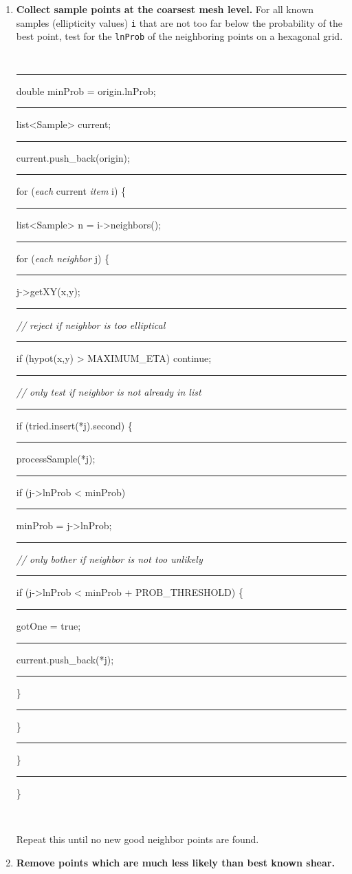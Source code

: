 \documentclass[useAMS,usenatbib,usegraphicx]{mn2e}
\begin{document}
\begin{enumerate}
\item {\bf Collect sample points at the coarsest mesh level.} 
For all known samples (ellipticity values) \texttt{i} that are not too far below 
the probability of the best point, test for the {\tt lnProb} of the neighboring points 
on a hexagonal grid. \\
\begin{boxit}
  {\tt 
  \rule{0.1in}{0in} double minProb = origin.lnProb;\\
  \rule{0.1in}{0in} list<Sample> current;\\
  \rule{0.1in}{0in} current.push\_back(origin);\\
  \rule{0.1in}{0in} for ({\it each} current {\it item} i) \{\\
  \rule{0.2in}{0in}   list<Sample> n = i->neighbors();\\
  \rule{0.2in}{0in}   for ({\it each neighbor} j) \{\\
  \rule{0.3in}{0in}     j->getXY(x,y); \\
  \rule{0.3in}{0in}     {{\it // reject if neighbor is too elliptical}} \\
  \rule{0.3in}{0in}     if (hypot(x,y) > MAXIMUM\_ETA) continue;\\
  \rule{0.3in}{0in}     {{\it // only test if neighbor is not already in list}} \\
  \rule{0.3in}{0in}     if (tried.insert(*j).second) \{ \\
  \rule{0.4in}{0in}       processSample(*j); \\
  \rule{0.4in}{0in}        if (j->lnProb < minProb) \\
  \rule{0.5in}{0in}           minProb = j->lnProb; \\
  \rule{0.4in}{0in}       {{\it // only bother if neighbor is not too unlikely}} \\
  \rule{0.4in}{0in}       if (j->lnProb < minProb + PROB\_THRESHOLD) \{ \\
  \rule{0.5in}{0in}         gotOne = true; \\
  \rule{0.5in}{0in}         current.push\_back(*j); \\
  \rule{0.4in}{0in}       \} \\
  \rule{0.3in}{0in}     \} \\
  \rule{0.2in}{0in}   \}  \\
  \rule{0.1in}{0in} \} } \\
\end{boxit}
Repeat this until no new good neighbor points are found.
\item {\bf Remove points which are much less likely than best known shear.}

\end{enumerate}
\end{document}
